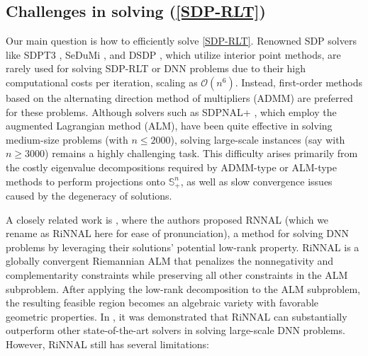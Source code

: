 \documentclass[11pt]{article}
\theoremstyle{plain}
\def\S{\mathbb{S}}
\begin{document}

\subsection{Challenges in solving (\ref{SDP-RLT})}

Our main question is how to efficiently solve \eqref{SDP-RLT}. Renowned SDP solvers like SDPT3 \cite{TTT}, SeDuMi \cite{sturm1999using}, and DSDP \cite{benson2008algorithm}, which utilize interior point methods, are rarely used for solving SDP-RLT or DNN problems due to their high computational costs per iteration, scaling as $\mathcal{O}(n^6)$. Instead, first-order methods based on the alternating direction method of multipliers (ADMM) \cite{SDPNALp1,chen2017efficient} are preferred for these problems. Although solvers such as SDPNAL+ \cite{SDPNAL,SDPNALp1,SDPNALp2}, which employ the augmented Lagrangian method (ALM), have been quite effective in solving medium-size problems (with $n \leq 2000$), solving large-scale instances (say with $n \geq 3000$) remains a highly challenging task. This difficulty arises primarily from the costly eigenvalue decompositions required by ADMM-type or ALM-type methods to perform projections onto $\S^n_+$, as well as slow convergence issues caused by the degeneracy of solutions. 

A closely related work is \cite{RiNNAL}, where the authors proposed RNNAL (which we rename as RiNNAL here for ease of pronunciation), a method for solving DNN problems by leveraging their solutions' potential low-rank property. RiNNAL is a globally convergent Riemannian ALM that penalizes the nonnegativity and complementarity constraints while preserving all other constraints in the ALM subproblem. After applying the low-rank decomposition to the ALM subproblem, the resulting feasible region becomes an algebraic variety with favorable geometric properties. In \cite{RiNNAL}, it was demonstrated that RiNNAL can substantially outperform other
state-of-the-art solvers in solving large-scale DNN problems. 
However, RiNNAL still has several limitations:
\end{document}

